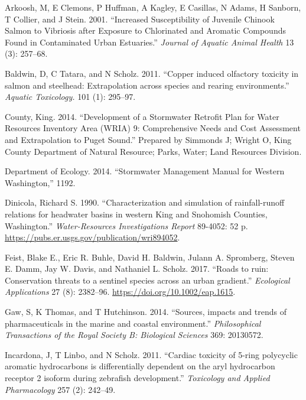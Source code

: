 \documentclass[
]{report}
\begin{document}
\leavevmode\hypertarget{ref-Arkoosh2001}{}%
Arkoosh, M, E Clemons, P Huffman, A Kagley, E Casillas, N Adams, H Sanborn, T Collier, and J Stein. 2001. ``Increased Susceptibility of Juvenile Chinook Salmon to Vibriosis after Exposure to Chlorinated and Aromatic Compounds Found in Contaminated Urban Estuaries.'' \emph{Journal of Aquatic Animal Health} 13 (3): 257--68.

\leavevmode\hypertarget{ref-Baldwin2011}{}%
Baldwin, D, C Tatara, and N Scholz. 2011. ``Copper induced olfactory toxicity in salmon and steelhead: Extrapolation across species and rearing environments.'' \emph{Aquatic Toxicology.} 101 (1): 295--97.

\leavevmode\hypertarget{ref-County2014}{}%
County, King. 2014. ``Development of a Stormwater Retrofit Plan for Water Resources Inventory Area (WRIA) 9: Comprehensive Needs and Cost Assessment and Extrapolation to Puget Sound.'' Prepared by Simmonds J; Wright O, King County Department of Natural Resource; Parks, Water; Land Resources Division.

\leavevmode\hypertarget{ref-DepartmentofEcology2014}{}%
Department of Ecology. 2014. ``Stormwater Management Manual for Western Washington,'' 1192.

\leavevmode\hypertarget{ref-Dinicola1990}{}%
Dinicola, Richard S. 1990. ``Characterization and simulation of rainfall-runoff relations for headwater basins in western King and Snohomish Counties, Washington.'' \emph{Water-Resources Investigations Report} 89-4052: 52 p. \url{https://pubs.er.usgs.gov/publication/wri894052}.

\leavevmode\hypertarget{ref-Feist2017}{}%
Feist, Blake E., Eric R. Buhle, David H. Baldwin, Julann A. Spromberg, Steven E. Damm, Jay W. Davis, and Nathaniel L. Scholz. 2017. ``Roads to ruin: Conservation threats to a sentinel species across an urban gradient.'' \emph{Ecological Applications} 27 (8): 2382--96. \url{https://doi.org/10.1002/eap.1615}.

\leavevmode\hypertarget{ref-Gaw2014}{}%
Gaw, S, K Thomas, and T Hutchinson. 2014. ``Sources, impacts and trends of pharmaceuticals in the marine and coastal environment.'' \emph{Philosophical Transactions of the Royal Society B: Biological Sciences} 369: 20130572.

\leavevmode\hypertarget{ref-Incardona2011}{}%
Incardona, J, T Linbo, and N Scholz. 2011. ``Cardiac toxicity of 5-ring polycyclic aromatic hydrocarbons is differentially dependent on the aryl hydrocarbon receptor 2 isoform during zebrafish development.'' \emph{Toxicology and Applied Pharmacology} 257 (2): 242--49.
\end{document}
